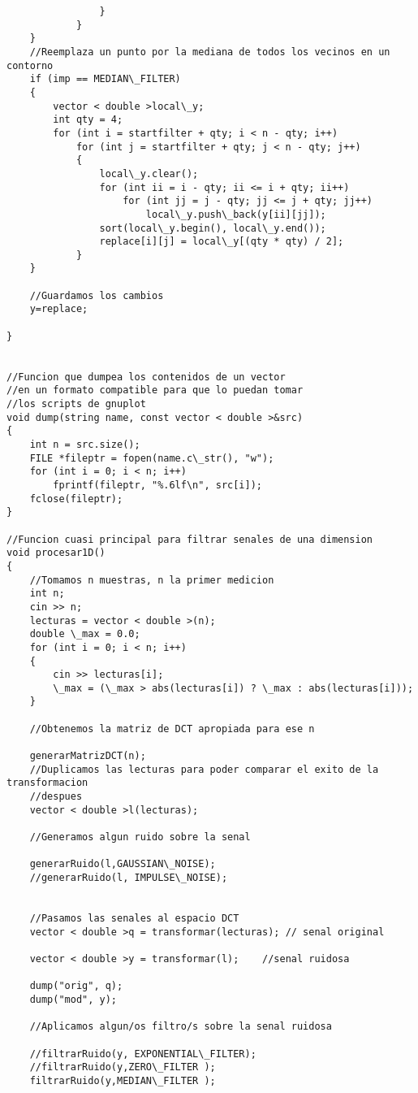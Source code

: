 \begin{lstlisting}
                }
            }
    }
    //Reemplaza un punto por la mediana de todos los vecinos en un contorno
    if (imp == MEDIAN\_FILTER)
    {
        vector < double >local\_y;
        int qty = 4;
        for (int i = startfilter + qty; i < n - qty; i++)
            for (int j = startfilter + qty; j < n - qty; j++)
            {
                local\_y.clear();
                for (int ii = i - qty; ii <= i + qty; ii++)
                    for (int jj = j - qty; jj <= j + qty; jj++)
                        local\_y.push\_back(y[ii][jj]);
                sort(local\_y.begin(), local\_y.end());
                replace[i][j] = local\_y[(qty * qty) / 2];
            }
    }

    //Guardamos los cambios
    y=replace;

}


//Funcion que dumpea los contenidos de un vector
//en un formato compatible para que lo puedan tomar
//los scripts de gnuplot
void dump(string name, const vector < double >&src)
{
    int n = src.size();
    FILE *fileptr = fopen(name.c\_str(), "w");
    for (int i = 0; i < n; i++)
        fprintf(fileptr, "%.6lf\n", src[i]);
    fclose(fileptr);
}

//Funcion cuasi principal para filtrar senales de una dimension
void procesar1D()
{
    //Tomamos n muestras, n la primer medicion
    int n;
    cin >> n;
    lecturas = vector < double >(n);
    double \_max = 0.0;
    for (int i = 0; i < n; i++)
    {
        cin >> lecturas[i];
        \_max = (\_max > abs(lecturas[i]) ? \_max : abs(lecturas[i]));
    }

    //Obtenemos la matriz de DCT apropiada para ese n

    generarMatrizDCT(n);
    //Duplicamos las lecturas para poder comparar el exito de la transformacion
    //despues
    vector < double >l(lecturas);

    //Generamos algun ruido sobre la senal

    generarRuido(l,GAUSSIAN\_NOISE);
    //generarRuido(l, IMPULSE\_NOISE);


    //Pasamos las senales al espacio DCT
    vector < double >q = transformar(lecturas);	// senal original

    vector < double >y = transformar(l);	//senal ruidosa

    dump("orig", q);
    dump("mod", y);

    //Aplicamos algun/os filtro/s sobre la senal ruidosa

    //filtrarRuido(y, EXPONENTIAL\_FILTER);
    //filtrarRuido(y,ZERO\_FILTER );
    filtrarRuido(y,MEDIAN\_FILTER );


\end{lstlisting}
